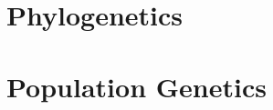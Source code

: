 \documentclass[12pt, a4paper]{book}
\begin{document}




\part{Phylogenetics}




\part{Population Genetics}

%
%

\appendix


\end{document}
